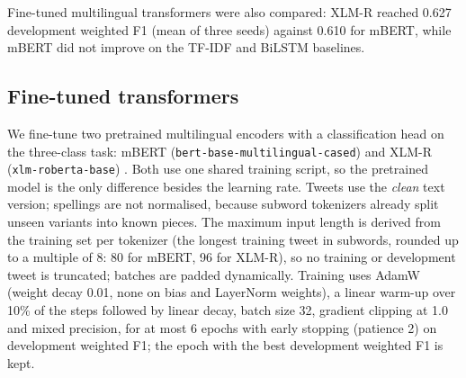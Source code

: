 
Fine-tuned multilingual transformers were also compared: XLM-R reached 0.627 development weighted F1 (mean of three seeds)
against 0.610 for mBERT, while mBERT did not improve on the TF-IDF and BiLSTM baselines.

\subsection{Fine-tuned transformers}
We fine-tune two pretrained multilingual encoders with a classification head on the three-class task: mBERT
(\texttt{bert-base-multilingual-cased}) \cite{devlin2019} and XLM-R (\texttt{xlm-roberta-base}) \cite{conneau2020}. Both use
one shared training script, so the pretrained model is the only difference besides the learning rate. Tweets use the
\emph{clean} text version; spellings are not normalised, because subword tokenizers already split unseen variants into known
pieces. The maximum input length is derived from the training set per tokenizer (the longest training tweet in subwords,
rounded up to a multiple of 8: 80 for mBERT, 96 for XLM-R), so no training or development tweet is truncated; batches are
padded dynamically. Training uses AdamW (weight decay 0.01, none on bias and LayerNorm weights), a linear warm-up over 10\% of
the steps followed by linear decay, batch size 32, gradient clipping at 1.0 and mixed precision, for at most 6 epochs with
early stopping (patience 2) on development weighted F1; the epoch with the best development weighted F1 is kept.

